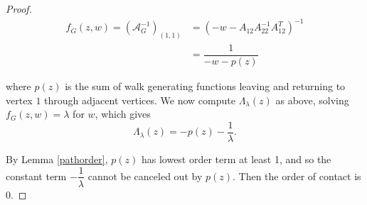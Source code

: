 \documentclass[12pt]{amsart}
\theoremstyle{remark}
\newcommand{\A}{\mathcal{A}}
\newcommand{\inv}{^{-1}}
\newcommand\la{\lambda}
\numberwithin{equation}{section}
\begin{document}
\begin{proof}
    \begin{align*}
        f_G(z,w) = (\A_G\inv)_{(1,1)} &= (-w - A_{12}A_{22}^{-1}A_{12}^T)^{-1} \\
        &= \dfrac{1}{-w-p(z)}
    \end{align*}

   where $p(z)$ is the sum of walk generating functions leaving and returning to vertex $1$ through adjacent vertices. We now compute $\Lambda_\la(z)$ as above, solving $f_G(z,w) = \la$ for $w$, which gives
   \[
   \Lambda_\la(z) = -p(z) - \frac{1}{\la}.
   \]

 By Lemma \ref{pathorder}, $p(z)$ has lowest order term at least 1, and so the constant term $-\dfrac{1}{\la}$ cannot be canceled out by $p(z)$. Then the order of contact is $0$. 
    

\end{proof}
\end{document}

